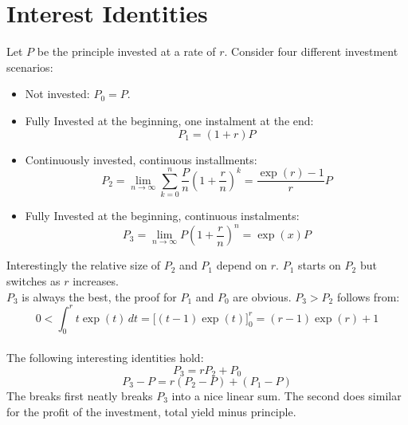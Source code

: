 
\section{Interest Identities}
Let $P$ be the principle invested at a rate of $r$.
Consider four different investment scenarios:
\begin{itemize}
	\item Not invested: $P_0 = P$.
	\item Fully Invested at the beginning, one instalment at the end:
		\[P_1 = (1+r)P\]
	\item Continuously invested, continuous installments:
		\[P_2 = \lim_{n\rightarrow\infty}\sum_{k=0}^n\frac{P}{n}\left(1+\frac{r}{n}\right)^k = \frac{\exp(r)-1}{r}P\]
	\item Fully Invested at the beginning, continuous instalments: 
		\[P_3 = \lim_{n\rightarrow \infty}P\left(1+\frac{r}{n}\right)^n = \exp(x)P\]
\end{itemize}

Interestingly the relative size of $P_2$ and $P_1$ depend on $r$.
$P_1$ starts on $P_2$ but switches as $r$ increases.\\

$P_3$ is always the best, the proof for $P_1$ and $P_0$ are obvious.
$P_3 > P_2$ follows from:
\[0 < \int_0^rt\exp(t)\,dt = \big[(t-1)\exp(t)\big]_0^r = (r-1)\exp(r)+1\] \\

The following interesting identities hold:
\[P_3 = rP_2+P_0\]
\[P_3-P = r(P_2-P) + (P_1-P)\]
The breaks first neatly breaks $P_3$ into a nice linear sum.
The second does similar for the profit of the investment, total yield minus principle.
